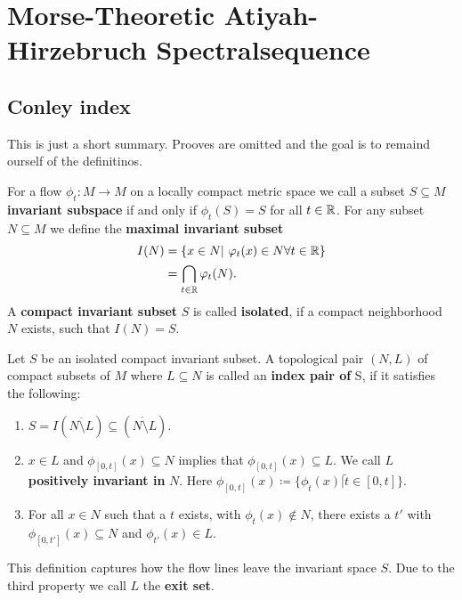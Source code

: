 \section{Morse-Theoretic Atiyah-Hirzebruch Spectralsequence}
\subsection{Conley index}
This is just a short summary. Prooves are omitted and the goal is to remaind ourself of the definitinos. 
\begin{definition}
	For a flow $\phi_t:M\to M$ on a locally compact metric space we call a subset $S\subseteq M$ \textbf{invariant subspace} if and only if $\phi_t(S)=S$ for all $t\in \mathbb{R}$. For any subset $N\subseteq M$ we define the \textbf{maximal invariant subset}
	\begin{align*}
		I(N)&=\{x\in N|~ \varphi_t(x)\in N \forall t\in \mathbb{R}\}\\
		&=\bigcap_{t\in \mathbb{R}} \varphi_t(N).
	\end{align*} A \textbf{compact invariant subset} $S$ is called \textbf{isolated}, if a compact neighborhood $N$ exists, such that $I(N)=S$.
\end{definition}
\begin{definition} \label{def: index pairs}
	Let $S$ be an isolated compact invariant subset. A topological pair $(N,L)$ of compact subsets of $M$ where $L\subseteq N$ is called an \textbf{index pair of }S, if it satisfies the following:
	\begin{enumerate}
		\item $S=I(\overline{N\setminus L})\subseteq (\mathring{N\setminus L})$.
		\item  $x\in L$ and $\phi_{[0,t]}(x)\subseteq N$ implies that  $\phi_{[0,t]}(x)\subseteq L$. We call $L$ \textbf{positively invariant in } $N$. Here $\phi_{[0,t]}(x)\coloneq\{ \phi_{\tilde{t}}(x)|\tilde{t}\in [0,t]\}$.
		\item For all $x\in N$ such that a $t$ exists, with $\phi_t(x)\not\in N$, there exists a $t'$ with $\phi_{[0,t']}(x)\subseteq N$ and $\phi_{t'}(x)\in L$.
	\end{enumerate}
	This definition captures how the flow lines leave the invariant space $S$. Due to the third property we call $L$ the \textbf{exit set}.
\end{definition}


